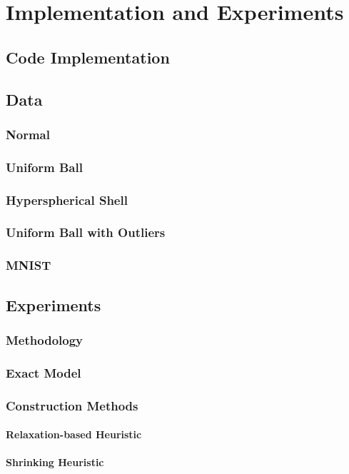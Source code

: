 \documentclass[11pt,twoside]{report}
\theoremstyle{definition}
\numberwithin{theorem}{section}
\numberwithin{definition}{section}
\numberwithin{lemma}{section}
\numberwithin{proposition}{section}
\numberwithin{equation}{section}
\numberwithin{figure}{section}
\begin{document}
\chapter{Implementation and Experiments}\label{implementation}
\section{Code Implementation}
\section{Data}\label{data}
\subsection{Normal}
\subsection{Uniform Ball}\label{uniform ball}
\subsection{Hyperspherical Shell}
\subsection{Uniform Ball with Outliers}
\subsection{MNIST}

\section{Experiments}
\subsection{Methodology}
\subsection{Exact Model}\label{exact benchmarks}
\subsection{Construction Methods}
\subsubsection{Relaxation-based Heuristic}
\subsubsection{Shrinking Heuristic}
\end{document}
